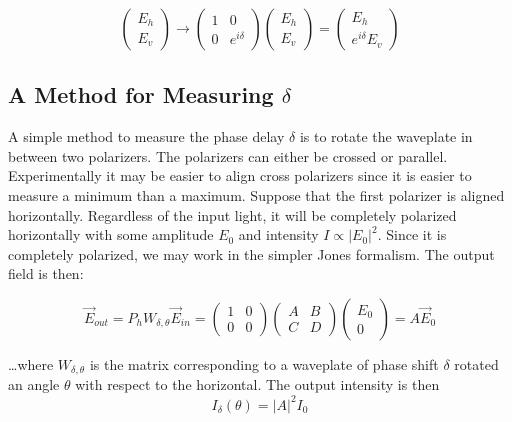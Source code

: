 \documentclass{article}
\begin{document}
\begin{equation}
    \label{eq:def_jones_wp}
    \begin{pmatrix}E_h \\ E_v 
    \end{pmatrix} \rightarrow 
    \begin{pmatrix}
        1 & 0 \\ 
        0 & e^{i\delta}
    \end{pmatrix}
    \begin{pmatrix}E_h \\ E_v 
    \end{pmatrix} = 
    \begin{pmatrix}E_h \\ e^{i\delta}E_v 
    \end{pmatrix}
\end{equation}

\subsection{A Method for Measuring $\delta$}
A simple method to measure the phase delay $\delta$ is to rotate the waveplate in between two polarizers. The polarizers can either be crossed or parallel. Experimentally it may be easier to align cross polarizers since it is easier to measure a minimum than a maximum. Suppose that the first polarizer is aligned horizontally. Regardless of the input light, it will be completely polarized horizontally with some amplitude $E_0$ and intensity $I\propto \vert E_0\vert^2$. Since it is completely polarized, we may work in the simpler Jones formalism. The output field is then:

\begin{equation}
    \label{eq:calpol_input}
    \vec{E}_{out} = P_hW_{\delta,\theta}\vec E_{in} = 
    \begin{pmatrix}
        1 & 0 \\ 
        0 & 0
    \end{pmatrix}
    \begin{pmatrix}
        A & B \\ 
        C & D
    \end{pmatrix} 
    \begin{pmatrix}E_0 \\ 0
    \end{pmatrix}=
    A\vec{E}_{0}
\end{equation}

\noindent\ldots where $W_{\delta,\theta}$ is the matrix corresponding to a waveplate of phase shift $\delta$ rotated an angle $\theta$ with respect to the horizontal. The output intensity is then
\begin{equation}
    \label{eq:calpol_intense}
    I_\delta(\theta) = \vert A\vert^2I_0
\end{equation}
\end{document}
